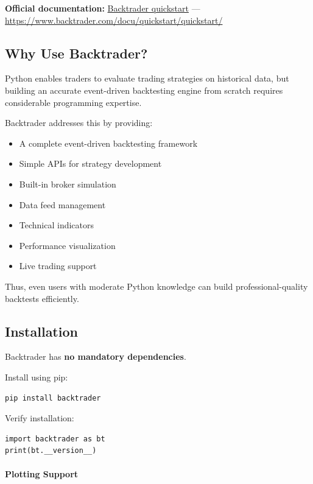 \documentclass[12pt,openany]{book}
\begin{document}
\textbf{Official documentation:} \href{https://www.backtrader.com/docu/quickstart/quickstart/}{Backtrader quickstart} --- \url{https://www.backtrader.com/docu/quickstart/quickstart/}

\subsection{Why Use Backtrader?}

Python enables traders to evaluate trading strategies on historical data, but building an accurate event-driven backtesting engine from scratch requires considerable programming expertise.

Backtrader addresses this by providing:

\begin{itemize}[leftmargin=*]
    \item A complete event-driven backtesting framework
    \item Simple APIs for strategy development
    \item Built-in broker simulation
    \item Data feed management
    \item Technical indicators
    \item Performance visualization
    \item Live trading support
\end{itemize}

Thus, even users with moderate Python knowledge can build professional-quality backtests efficiently.

\subsection{Installation}

Backtrader has \textbf{no mandatory dependencies}.

Install using pip:

\begin{Verbatim}[breaklines=true,breakanywhere=true,fontsize=\small]
pip install backtrader
\end{Verbatim}

Verify installation:

\begin{Verbatim}[breaklines=true,breakanywhere=true,fontsize=\small]
import backtrader as bt
print(bt.__version__)
\end{Verbatim}

\paragraph{Plotting Support}
\end{document}
